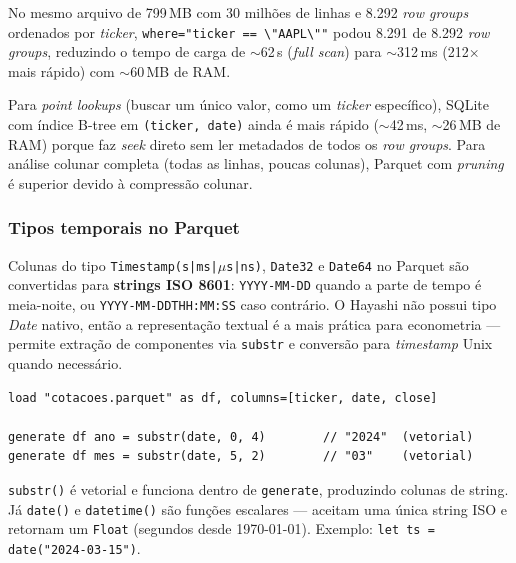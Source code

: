 No mesmo arquivo de 799\,MB com 30 milhões de linhas e 8.292 \textit{row groups}
ordenados por \textit{ticker}, \texttt{where="ticker == \textbackslash"AAPL\textbackslash""}
podou 8.291 de 8.292 \textit{row groups}, reduzindo o tempo de carga de
$\sim$62\,s (\textit{full scan}) para $\sim$312\,ms (212$\times$ mais rápido)
com $\sim$60\,MB de RAM.

\begin{nota}
  Para \textit{point lookups} (buscar um único valor, como um \textit{ticker}
  específico), SQLite com índice B-tree em \texttt{(ticker, date)} ainda é
  mais rápido ($\sim$42\,ms, $\sim$26\,MB de RAM) porque faz \textit{seek}
  direto sem ler metadados de todos os \textit{row groups}. Para análise
  colunar completa (todas as linhas, poucas colunas), Parquet com \textit{pruning}
  é superior devido à compressão colunar.
\end{nota}

\subsubsection*{Tipos temporais no Parquet}

Colunas do tipo \texttt{Timestamp(s|ms|$\mu$s|ns)}, \texttt{Date32} e
\texttt{Date64} no Parquet são convertidas para \textbf{strings ISO 8601}:
\texttt{YYYY-MM-DD} quando a parte de tempo é meia-noite, ou
\texttt{YYYY-MM-DDTHH:MM:SS} caso contrário. O Hayashi não possui tipo
\textit{Date} nativo, então a representação textual é a mais prática para
econometria --- permite extração de componentes via \texttt{substr} e
conversão para \textit{timestamp} Unix quando necessário.

\begin{lstlisting}[caption={Extraindo componentes de datas}]
load "cotacoes.parquet" as df, columns=[ticker, date, close]

generate df ano = substr(date, 0, 4)        // "2024"  (vetorial)
generate df mes = substr(date, 5, 2)        // "03"    (vetorial)
\end{lstlisting}

\begin{nota}
  \texttt{substr()} é vetorial e funciona dentro de \texttt{generate}, produzindo
  colunas de string. Já \texttt{date()} e \texttt{datetime()} são funções
  escalares --- aceitam uma única string ISO e retornam um \texttt{Float}
  (segundos desde 1970-01-01). Exemplo: \texttt{let ts = date("2024-03-15")}.
\end{nota}

